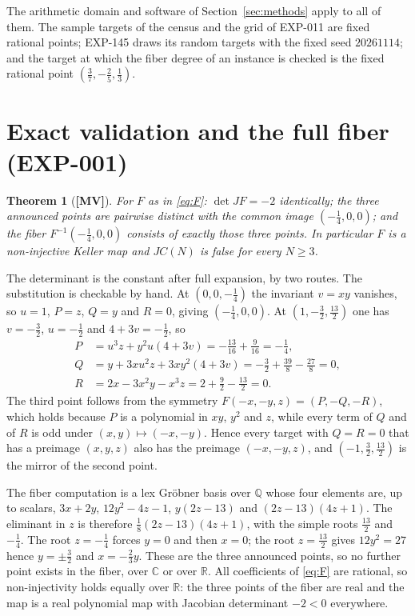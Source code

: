 \documentclass[11pt]{article}
\newtheorem{theorem}{Theorem}[section]
\theoremstyle{definition}
\theoremstyle{remark}
\newcommand{\C}{\mathbb{C}}
\newcommand{\Q}{\mathbb{Q}}
\newcommand{\R}{\mathbb{R}}
\newcommand{\detJ}{\det JF}
\newcommand{\MV}{\textbf{[MV]}}
\begin{document}
The arithmetic domain and software of Section~\ref{sec:methods} apply to all of them. The sample targets of the census and the grid of EXP-011 are fixed rational points; EXP-145 draws its random targets with the fixed seed $20261114$; and the target at which the fiber degree of an instance is checked is the fixed rational point $(\tfrac37, -\tfrac25, \tfrac13)$.

\section[Exact validation and the full fiber (EXP-001)]{Exact validation and the full fiber\\ (EXP-001)}\label{sec:valid}

\begin{theorem}[{\MV}]\label{thm:valid}
For $F$ as in \eqref{eq:F}: $\detJ = -2$ identically; the three announced points are pairwise
distinct with the common image $(-\tfrac14, 0, 0)$; and the fiber
$F^{-1}(-\tfrac14, 0, 0)$ consists of exactly those three points. In particular $F$ is a
non-injective Keller map and $JC(N)$ is false for every $N \ge 3$.
\end{theorem}

The determinant is the constant \numDetF{} after full expansion, by two routes. The substitution is checkable by hand. At $(0,0,-\tfrac14)$ the invariant $v = xy$ vanishes, so $u = 1$, $P = z$, $Q = y$ and $R = 0$, giving
$(-\tfrac14, 0, 0)$. At $(1, -\tfrac32, \tfrac{13}{2})$ one has $v = -\tfrac32$, $u = -\tfrac12$ and $4 + 3v = -\tfrac12$, so
\begin{equation}\label{eq:hand}
\begin{aligned}
P &= u^3 z + y^2 u (4 + 3v) = -\tfrac{13}{16} + \tfrac{9}{16} = -\tfrac14, \\
Q &= y + 3x u^2 z + 3x y^2 (4 + 3v) = -\tfrac32 + \tfrac{39}{8} - \tfrac{27}{8} = 0, \\
R &= 2x - 3x^2 y - x^3 z = 2 + \tfrac{9}{2} - \tfrac{13}{2} = 0 .
\end{aligned}
\end{equation}
The third point follows from the symmetry $F(-x,-y,z) = (P, -Q, -R)$, which holds because $P$ is a polynomial in $xy$, $y^2$ and $z$, while every term of $Q$ and of $R$ is odd under $(x,y) \mapsto (-x,-y)$. Hence every target with $Q = R = 0$
that has a preimage $(x,y,z)$ also has the preimage $(-x,-y,z)$, and $(-1,\tfrac32,\tfrac{13}{2})$ is the mirror of the second point.

The fiber computation is a lex Gr\"obner basis over $\Q$ whose four elements are, up to scalars,
$3x + 2y$, $12y^2 - 4z - 1$, $y(2z - 13)$ and $(2z - 13)(4z + 1)$. The eliminant in $z$ is therefore $\tfrac18(2z - 13)(4z + 1)$, with the simple roots $\tfrac{13}{2}$ and $-\tfrac14$. The root $z = -\tfrac14$ forces $y = 0$ and then $x = 0$; the root $z = \tfrac{13}{2}$ gives $12y^2 = 27$ hence $y = \pm\tfrac32$ and $x = -\tfrac23 y$. These are the three announced points, so no further point exists in the fiber, over $\C$ or over $\R$. All coefficients of \eqref{eq:F} are rational, so non-injectivity holds equally over $\R$: the three points of the fiber are real and the map is a real polynomial map with Jacobian determinant $-2 < 0$ everywhere.
\end{document}
